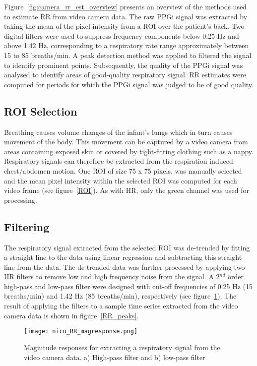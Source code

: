 Figure~\ref{fig:camera_rr_est_overview} presents an overview of the methods used to estimate RR from video camera data. The raw PPGi signal was extracted by taking the mean of the pixel intensity from a ROI over the patient's back. Two digital filters were used to suppress frequency components below 0.25 Hz and above 1.42 Hz, corresponding to a respiratory rate range approximately between 15 to 85 breaths/min. A peak detection method was applied to filtered the signal to identify prominent points. Subsequently, the quality of the PPGi signal was analysed to identify areas of good-quality respiratory signal. RR estimates were computed for periods for which the PPGi signal was judged to be of good quality.

\subsection{ROI Selection}
\label{roirr}

Breathing causes volume changes of the infant's lungs which in turn causes movement of the body. This movement can be captured by a video camera from areas containing exposed skin or covered by tight-fitting clothing such as a nappy. Respiratory signals can therefore be extracted from the respiration induced chest/abdomen motion. One ROI of size 75 x 75 pixels, was manually selected and the mean pixel intensity within the selected ROI was computed for each video frame (see figure~\ref{ROI}). As with HR, only the green channel was used for processing.
 
\subsection{Filtering}
\label{filteringrr}

The respiratory signal extracted from the selected ROI was de-trended by fitting a straight line to the data using linear regression and subtracting this straight line from the data. The de-trended data was further processed by applying two IIR filters  to remove low and high frequency noise from the signal. A 2$^{nd}$ order high-pass and low-pass filter were designed with cut-off frequencies of 0.25 Hz (15 breaths/min) and 1.42 Hz (85 breaths/min), respectively (see figure~\ref{filterrr}). The result of applying the filters to a sample time series extracted from the video camera data is shown in figure~\ref{RR_peaks}.

\begin{figure}[!ht]
\centering
\texttt{[image: nicu\_RR\_magresponse.png]}
    \caption[Magnitude responses for extracting a respiratory signal from the video camera data.]{Magnitude responses for extracting a respiratory signal from the video camera data. a) High-pass filter and b) low-pass filter.}
\label{filterrr}
    \end{figure}

